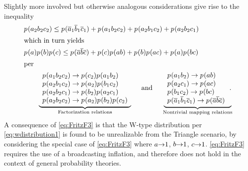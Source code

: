 \bigskip
Slightly more involved but otherwise analogous considerations give rise to the inequality
\begin{align}\label{eq:trifancyunmapped}
  &  \p{a_2 b_2 c_2}\leq {\p{\n{a}_1 \n{b}_1 \n{c}_1} + \p{a_1 b_2 c_2} + \p{a_2 b_1 c_2} + \p{a_2 b_2 c_1}} \\
\shortintertext{which in turn yields}
\label{eq:FritzF3}
  & \p{a} \p{b} \p{c} \leq {\p{\n{a} \n{b} \n{c}} +\p{c}\p{a b}  + \p{b}\p{a c}  + \p{a} \p{b c}}\\
\shortintertext{per}
&\qquad
 \underbrace{\begin{array}{l}
 \p{a_1 b_2 c_2}\to \p{c_2} \p{a_1 b_2} \\
 \p{a_2 b_1 c_2}\to \p{a_2} \p{b_1 c_2} \\
 \p{a_2 b_2 c_1}\to \p{b_2} \p{a_2 c_1} \\
 \p{a_2 b_2 c_2}\to \p{a_2} \p{b_2} \p{c_2} \\
\end{array}}_{\text{Factorization relations}}   \quad \text{ and }\quad
\underbrace{\begin{array}{l}
\p{a_1 b_2} \to \p{a b} \\
\p{a_2 c_1} \to \p{a c} \\
\p{b_1 c_2} \to \p{b c} \\
\p{\n{a}_1 \n{b}_1 \n{c}_1}\to \p{\n{a} \n{b} \n{c}}  \\
\end{array}\,.}_{\text{Nontrivial mapping relations}}
\end{align}
A consequence of \cref{eq:FritzF3} is that the W-type distribution per \cref{eq:wdistribution1}
is found to be unrealizable from the Triangle scenario, by considering the special case of \cref{eq:FritzF3} where $a\mathord{\to}1$, $b\mathord{\to}1$, $c\mathord{\to}1$. \cref{eq:FritzF3} requires the use of a broadcasting inflation, and therefore does not hold in the context of general probability theories.

